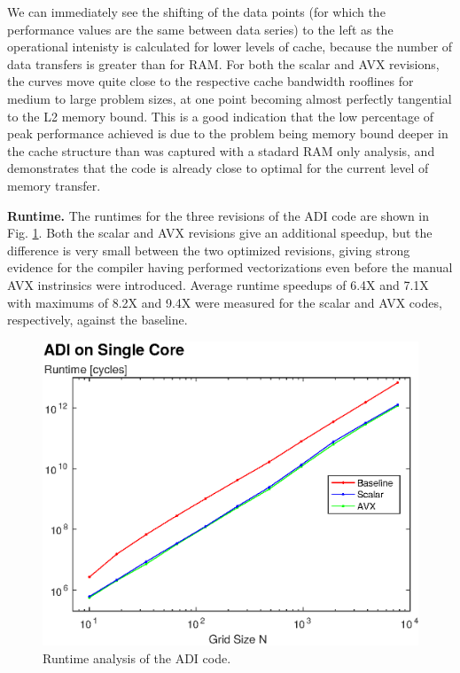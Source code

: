 \documentclass[letterpaper]{article}
\newcommand{\mypar}[1]{{\bf #1.}}
\begin{document}
We can immediately see the shifting of the data points (for which the performance values are the same between data series) to the left as the operational intenisty is calculated for lower levels of cache, because the number of data transfers is greater than for RAM. For both the scalar and AVX revisions, the curves move quite close to the respective cache bandwidth rooflines for medium to large problem sizes, at one point becoming almost perfectly tangential to the L2 memory bound. This is a good indication that the low percentage of peak performance achieved is due to the problem being memory bound deeper in the cache structure than was captured with a stadard RAM only analysis, and demonstrates that the code is already close to optimal for the current level of memory transfer.

\mypar{Runtime}
The runtimes for the three revisions of the ADI code are shown in Fig. \ref{fig:runtime_ADI}. Both the scalar and AVX revisions give an additional speedup, but the difference is very small between the two optimized revisions, giving strong evidence for the compiler having performed vectorizations even before the manual AVX instrinsics were introduced. Average runtime speedups of 6.4X and 7.1X with maximums of 8.2X and  9.4X were measured for the scalar and AVX codes, respectively, against the baseline.

\begin{figure}\centering
  \includegraphics[width=\linewidth]{./plots/runtime_ADI.eps}
  \caption{Runtime analysis of the ADI code.}
  \label{fig:runtime_ADI}
\end{figure}
\end{document}
